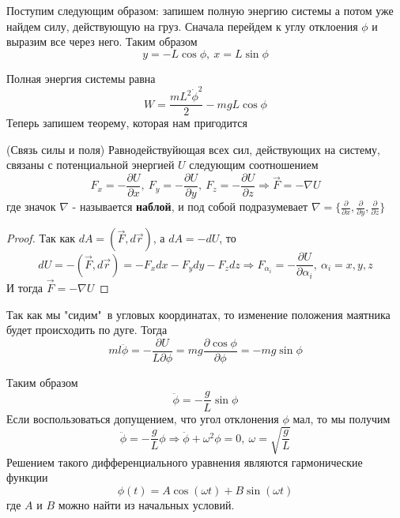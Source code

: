 Поступим следующим образом: запишем полную энергию системы а потом уже найдем силу, действующую на груз. Сначала перейдем к углу отклоения $\phi$ и выразим все через него. Таким образом
\begin{equation*}
    y = -L\cos \phi,\ x = L \sin \phi
\end{equation*} 

Полная энергия системы равна
\begin{equation*}
    W = \frac{m L^2 \dot{\phi}^2}{2} - mgL \cos \phi
\end{equation*}
Теперь запишем теорему, которая нам пригодится
\begin{theorem}(Связь силы и поля)
    Равнодействуйющая всех сил, действующих на систему, связаны с потенциальной энергией $U$ следующим соотношением
    \begin{equation*}
        F_x = -\frac{\partial U}{\partial x},\ F_y = -\frac{\partial U}{\partial y},\ F_z = -\frac{\partial U}{\partial z} \Rightarrow \vec{F} = - \nabla U
    \end{equation*}
    где значок $\nabla$ - называется \textbf{наблой}, и под собой подразумевает $\nabla = \{\frac{\partial}{\partial x},\frac{\partial}{\partial y}, \frac{\partial}{\partial z} \}$
\end{theorem}
\begin{proof}
    Так как $dA = (\vec{F}, d \vec{r})$, а $dA = - dU$, то 
    \begin{equation*}
        dU = -(\vec{F}, d \vec{r}) = - F_x dx - F_y dy - F_z dz \Rightarrow F_{\alpha_i} = - \frac{\partial U}{\partial \alpha_i},\ \alpha_i = {x, y, z}
    \end{equation*}
    И тогда $\vec{F} = - \nabla U$
\end{proof}
Так как мы "сидим"\ в угловых координатах, то изменение положения маятника будет происходить по дуге. Тогда
\begin{equation*}
    m l \ddot{\phi} = - \frac{\partial U}{L \partial \phi} = mg \frac{\partial \cos \phi}{\partial \phi } = - mg \sin \phi
\end{equation*}

Таким образом
\begin{equation*}
    \ddot{\phi} = - \frac{g}{L} \sin \phi
\end{equation*}
Если воспользоваться допущением, что угол отклонения $\phi$ мал, то мы получим
\begin{equation*}
    \ddot{\phi} = - \frac{g}{L} \phi \Rightarrow \ddot{\phi} + \omega^2 \phi = 0,\ \omega = \sqrt{\frac{g}{L}}
\end{equation*}
Решением такого дифференциального уравнения являются гармонические функции
\begin{equation*}
    \phi(t) = A \cos (\omega t) + B \sin (\omega t)
\end{equation*}
где $A$ и $B$ можно найти из начальных условий. 

